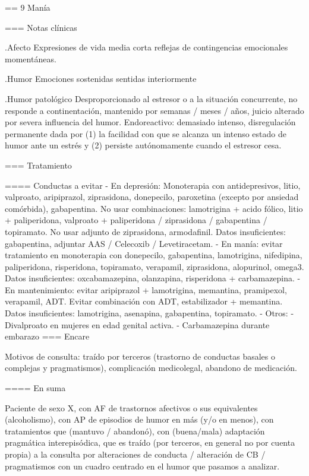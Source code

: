 \documentclass[encares.tex]{subfiles}
\begin{document}
== 9 Manía

=== Notas clínicas

.Afecto
Expresiones de vida media corta reflejas de contingencias emocionales momentáneas.

.Humor
Emociones sostenidas sentidas interiormente

.Humor patológico
Desproporcionado al estresor o a la situación concurrente, no responde a continentación, mantenido por semanas / meses / años, juicio alterado por severa influencia del humor. Endoreactivo: demasiado intenso, disregulación permanente dada por (1) la facilidad con que se alcanza un intenso estado de humor ante un estrés y (2) persiste autónomamente cuando el estresor cesa.

=== Tratamiento

==== Conductas a evitar
- En depresión: Monoterapia con antidepresivos, litio, valproato, aripiprazol, ziprasidona, donepecilo, paroxetina (excepto por ansiedad comórbida), gabapentina. No usar combinaciones: lamotrigina + acido fólico, litio + paliperidona, valproato + paliperidona / ziprasidona / gabapentina / topiramato. No usar adjunto de ziprasidona, armodafinil. Datos insuficientes: gabapentina, adjuntar AAS / Celecoxib / Levetiracetam.
- En manía: evitar tratamiento en monoterapia con donepecilo, gabapentina, lamotrigina, nifedipina, paliperidona, risperidona, topiramato, verapamil, ziprasidona, alopurinol, omega3. Datos insuficientes: oxcabamazepina, olanzapina, risperidona + carbamazepina.
- En mantenimiento: evitar aripiprazol + lamotrigina, memantina, pramipexol, verapamil, ADT. Evitar combinación con ADT, estabilizador + memantina. Datos insuficientes: lamotrigina, asenapina, gabapentina, topiramato.
- Otros:
  - Divalproato en mujeres en edad genital activa.
  - Carbamazepina durante embarazo
=== Encare

Motivos de consulta: traído por terceros (trastorno de conductas basales o complejas y pragmatismos), complicación medicolegal, abandono de medicación.

==== En suma

Paciente de sexo X, con AF de trastornos afectivos o sus equivalentes (alcoholismo), con AP de episodios de humor en más (y/o en menos), con tratamientos que (mantuvo / abandonó), con (buena/mala) adaptación pragmática interepisódica, que es traído (por terceros, en general no por cuenta propia) a la consulta por alteraciones de conducta / alteración de CB / pragmatismos con un cuadro centrado en el humor que pasamos a analizar.
\end{document}

